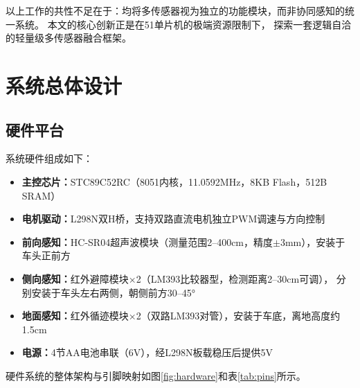 \documentclass[12pt,a4paper]{ctexart}
\begin{document}
以上工作的共性不足在于：均将多传感器视为独立的功能模块，而非协同感知的统一系统。
本文的核心创新正是在51单片机的极端资源限制下，
探索一套逻辑自洽的轻量级多传感器融合框架。

\section{系统总体设计}

\subsection{硬件平台}

系统硬件组成如下：

\begin{itemize}
    \item \textbf{主控芯片：}STC89C52RC（8051内核，11.0592MHz，8KB Flash，512B SRAM）
    \item \textbf{电机驱动：}L298N双H桥，支持双路直流电机独立PWM调速与方向控制
    \item \textbf{前向感知：}HC-SR04超声波模块（测量范围2--400cm，精度$\pm$3mm），安装于车头正前方
    \item \textbf{侧向感知：}红外避障模块×2（LM393比较器型，检测距离2--30cm可调），
          分别安装于车头左右两侧，朝侧前方30--45°
    \item \textbf{地面感知：}红外循迹模块×2（双路LM393对管），安装于车底，离地高度约1.5cm
    \item \textbf{电源：}4节AA电池串联（6V），经L298N板载稳压后提供5V
\end{itemize}

硬件系统的整体架构与引脚映射如图\ref{fig:hardware}和表\ref{tab:pins}所示。
\end{document}
